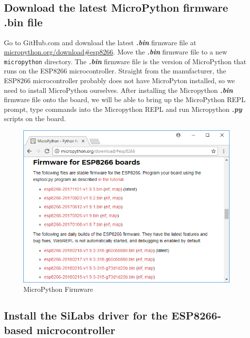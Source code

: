 \documentclass{book}
\makeatletter
\def\maxwidth{\ifdim\Gin@nat@width>\linewidth\linewidth
    \else\Gin@nat@width\fi}
\let\Oldincludegraphics\includegraphics
\renewcommand{\includegraphics}[1]{\Oldincludegraphics[width=.8\maxwidth]{#1}}
\makeatother
\begin{document}
    
        \subsection{Download the latest MicroPython firmware .bin
file}\label{download-the-latest-micropython-firmware-.bin-file}
    




    
        Go to GitHub.com and download the latest \textbf{\emph{.bin}} firmware
file at
\href{https://micropython.org/download\#esp8266}{micropython.org/download\#esp8266}.
Move the \textbf{\emph{.bin}} firmware file to a new
\lstinline!micropython! directory. The \textbf{\emph{.bin}} firmware
file is the version of MicroPython that runs on the ESP8266
microcontroller. Straight from the manufacturer, the ESP8266
microcontroller probably does not have MicroPyton installed, so we need
to install MicroPython ourselves. After installing the Micropython
\textbf{\emph{.bin}} firmware file onto the board, we will be able to
bring up the MicroPython REPL prompt, type commands into the Micropython
REPL and run Micropython \textbf{\emph{.py}} scripts on the board.

\begin{figure}
\centering
\includegraphics{images/firmware_download_page.PNG}
\caption{MicroPython Firmware}
\end{figure}
    




    
        \subsection{Install the SiLabs driver for the ESP8266-based
microcontroller}\label{install-the-silabs-driver-for-the-esp8266-based-microcontroller}
    
\end{document}
